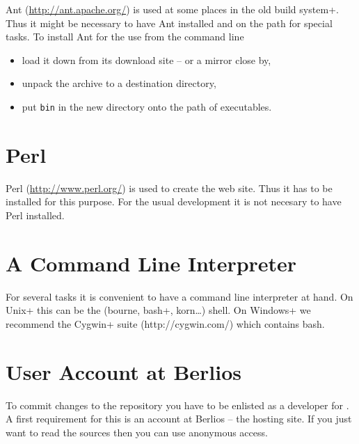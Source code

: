 Ant (\url{http://ant.apache.org/}) is used at some places in the old
\+build system+. Thus it might be necessary to have Ant installed and
on the path for special tasks. To install Ant for the use from the
command line

\begin{itemize}
\item load it down from its download site -- or a mirror close by,
\item unpack the archive to a destination directory,
\item put \texttt{bin} in the new directory onto the path of
  executables.
\end{itemize}


\section{Perl}

Perl (\url{http://www.perl.org/}) is used to create the web site. Thus
it has to be installed for this purpose. For the usual development it
is not necesary to have Perl installed. 


\section{A Command Line Interpreter}

For several tasks it is convenient to have a command line interpreter
at hand. On \+Unix+ this can be the (bourne,
\+bash+, korn\ldots) shell. On \+Windows+ we
recommend the \+Cygwin+ suite (http://cygwin.com/) which contains
bash.  

\section{User Account at Berlios}

To commit changes to the repository you have to be enlisted as a
developer for \ExTeX. A first requirement for this is an account at
Berlios -- the hosting site. If you just want to read the sources then
you can use anonymous access.

